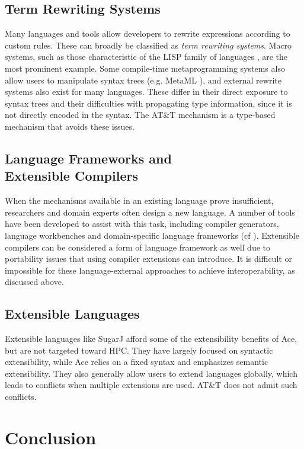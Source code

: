 \documentclass[9pt,preprint]{sigplanconf}
\begin{document}
\subsection{Term Rewriting Systems}
Many languages and tools allow developers to rewrite expressions according to custom rules. These can broadly be classified as {\it term rewriting systems}. Macro systems, such as those characteristic of the LISP family of languages \cite{mccarthy1978history}, are the most prominent example. Some compile-time metaprogramming systems also allow users to manipulate syntax trees (e.g. MetaML \cite{Sheard:1999:UMS}), and external rewrite systems also exist for many languages. These differ in their direct exposure to syntax trees and their difficulties with propagating type information, since it is not directly encoded in the syntax. The AT\&T mechanism is a type-based mechanism that avoids these issues.

\subsection{Language Frameworks and \\Extensible Compilers}
When the mechanisms available in an existing language prove insufficient, researchers and domain experts often design a new language. A number of tools have been developed to assist with this task, including compiler generators, language workbenches and domain-specific language frameworks (cf \cite{fowler2010domain}). Extensible compilers can be considered a form of language framework as well due to portability issues that using compiler extensions can introduce. It is difficult or impossible for these language-external approaches to achieve interoperability, as discussed above.

\subsection{Extensible Languages}
Extensible languages like SugarJ \cite{erdweg2011sugarj} afford some of the extensibility benefits of Ace, but are not targeted toward HPC. They have largely focused on syntactic extensibility, while Ace relies on a fixed syntax and emphasizes semantic extensibility. They also generally allow users to extend languages globally, which leads to conflicts when multiple extensions are used. AT\&T does not admit such conflicts.

\section{Conclusion}
\end{document}
